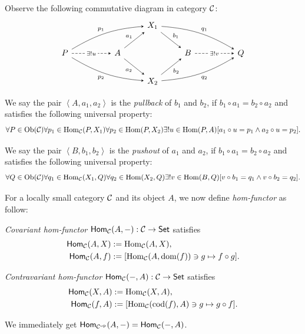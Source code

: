 \documentclass{article}
\begin{document}
\begin{defi}
	Observe the following commutative diagram in category $\mathcal{C}$:
	\[\begin{tikzcd}
		& & & X_1 \arrow[->,>=stealth,rd, "b_1"] \arrow[->,>=stealth,rrrd, "q_1", bend left=13] & & & \\
		P \arrow[->,>=stealth,rrru, "p_1", bend left=13] \arrow[->,>=stealth,rrrd, "p_2"', bend right=13] \arrow[->,>=stealth,rr, "\exists!u" description, dashed] & &
		A \arrow[->,>=stealth,ru, "a_1"] \arrow[->,>=stealth,rd, "a_2"'] & & B \arrow[->,>=stealth,rr, "\exists!v" description, dashed] & & Q \\ & & &
		X_2 \arrow[->,>=stealth,ru, "b_2"'] \arrow[->,>=stealth,rrru, "q_2"', bend right=13] & & &
	\end{tikzcd}\]
	
	We say the pair $\left<A,a_1,a_2\right>$ is the \emph{pullback} of $b_1$ and $b_2$, if $b_1\circ a_1=b_2\circ a_2$ and satisfies the following universal property:
		$$\forall P\in\mathrm{Ob}(\mathcal{C})\forall p_1\in\mathrm{Hom}_{\mathcal{C}}(P,X_1)\forall p_2\in\mathrm{Hom}(P,X_2)\exists!u\in\mathrm{Hom}(P,A)[a_1\circ u=p_1\wedge a_2\circ u=p_2].$$
	
	We say the pair $\left<B,b_1,b_2\right>$ is the \emph{pushout} of $a_1$ and $a_2$, if $b_1\circ a_1=b_2\circ a_2$ and satisfies the following universal property:
		$$\forall Q\in\mathrm{Ob}(\mathcal{C})\forall q_1\in\mathrm{Hom}_{\mathcal{C}}(X_1,Q)\forall q_2\in\mathrm{Hom}(X_2,Q)\exists!v\in\mathrm{Hom}(B,Q)[v\circ b_1=q_1\wedge v\circ b_2=q_2].$$
\end{defi}

\begin{defi}
	For a locally small category $\mathcal{C}$ and its object $A$, we now define \emph{hom-functor} as follow:
	
	\emph{Covariant hom-functor} $\mathsf{Hom}_{\mathcal{C}}(A,-):\mathcal{C}\to\mathsf{Set}$ satisfies
	\begin{align*}
		\mathsf{Hom}_{\mathcal{C}}(A,X) &:= \mathrm{Hom}_{\mathcal{C}}(A,X),\\
		\mathsf{Hom}_{\mathcal{C}}(A,f) &:= [\mathrm{Hom}_{\mathcal{C}}(A,\mathrm{dom}(f))\ni g\mapsto f\circ g].
	\end{align*}
	
	\emph{Contravariant hom-functor} $\mathsf{Hom}_{\mathcal{C}}(-,A):\mathcal{C}\to\mathsf{Set}$ satisfies
	\begin{align*}
		\mathsf{Hom}_{\mathcal{C}}(X,A) &:= \mathrm{Hom}_{\mathcal{C}}(X,A),\\
		\mathsf{Hom}_{\mathcal{C}}(f,A) &:= [\mathrm{Hom}_{\mathcal{C}}(\mathrm{cod}(f),A)\ni g\mapsto g\circ f].
	\end{align*}
	
	We immediately get $\mathsf{Hom}_{\mathcal{C}^\mathrm{op}}(A,-)=\mathsf{Hom}_{\mathcal{C}}(-,A)$.
\end{defi}
\end{document}
